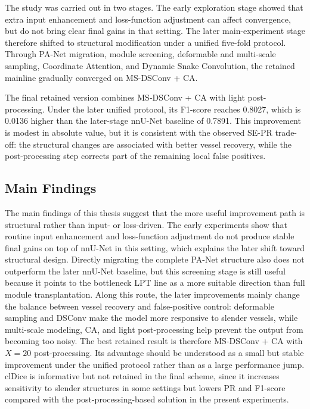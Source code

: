 \documentclass[a4paper,11pt]{article}
\begin{document}
The study was carried out in two stages. The early exploration stage showed that extra input enhancement and loss-function adjustment can affect convergence, but do not bring clear final gains in that setting. The later main-experiment stage therefore shifted to structural modification under a unified five-fold protocol. Through PA-Net migration, module screening, deformable and multi-scale sampling, Coordinate Attention, and Dynamic Snake Convolution, the retained mainline gradually converged on MS-DSConv + CA.

The final retained version combines MS-DSConv + CA with light post-processing. Under the later unified protocol, its F1-score reaches 0.8027, which is 0.0136 higher than the later-stage nnU-Net baseline of 0.7891. This improvement is modest in absolute value, but it is consistent with the observed SE-PR trade-off: the structural changes are associated with better vessel recovery, while the post-processing step corrects part of the remaining local false positives.

\subsection{Main Findings}
The main findings of this thesis suggest that the more useful improvement path is structural rather than input- or loss-driven.
The early experiments show that routine input enhancement and loss-function adjustment do not produce stable final gains on top of nnU-Net in this setting, which explains the later shift toward structural design.
Directly migrating the complete PA-Net structure also does not outperform the later nnU-Net baseline, but this screening stage is still useful because it points to the bottleneck LPT line as a more suitable direction than full module transplantation.
Along this route, the later improvements mainly change the balance between vessel recovery and false-positive control: deformable sampling and DSConv make the model more responsive to slender vessels, while multi-scale modeling, CA, and light post-processing help prevent the output from becoming too noisy.
The best retained result is therefore MS-DSConv + CA with \(X=20\) post-processing.
Its advantage should be understood as a small but stable improvement under the unified protocol rather than as a large performance jump.
clDice is informative but not retained in the final scheme, since it increases sensitivity to slender structures in some settings but lowers PR and F1-score compared with the post-processing-based solution in the present experiments.
\end{document}
